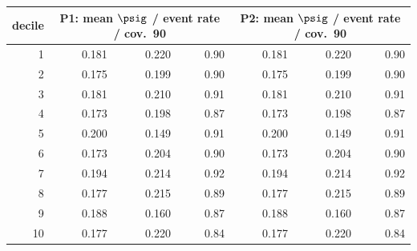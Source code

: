 \begin{tabular}{rrrrrrr}
\toprule
decile & \multicolumn{3}{c}{P1: mean $\psig$ / event rate / cov.\ 90} & \multicolumn{3}{c}{P2: mean $\psig$ / event rate / cov.\ 90} \\
\midrule
1 & 0.181 & 0.220 & 0.90 & 0.181 & 0.220 & 0.90 \\
2 & 0.175 & 0.199 & 0.90 & 0.175 & 0.199 & 0.90 \\
3 & 0.181 & 0.210 & 0.91 & 0.181 & 0.210 & 0.91 \\
4 & 0.173 & 0.198 & 0.87 & 0.173 & 0.198 & 0.87 \\
5 & 0.200 & 0.149 & 0.91 & 0.200 & 0.149 & 0.91 \\
6 & 0.173 & 0.204 & 0.90 & 0.173 & 0.204 & 0.90 \\
7 & 0.194 & 0.214 & 0.92 & 0.194 & 0.214 & 0.92 \\
8 & 0.177 & 0.215 & 0.89 & 0.177 & 0.215 & 0.89 \\
9 & 0.188 & 0.160 & 0.87 & 0.188 & 0.160 & 0.87 \\
10 & 0.177 & 0.220 & 0.84 & 0.177 & 0.220 & 0.84 \\
\bottomrule
\end{tabular}

